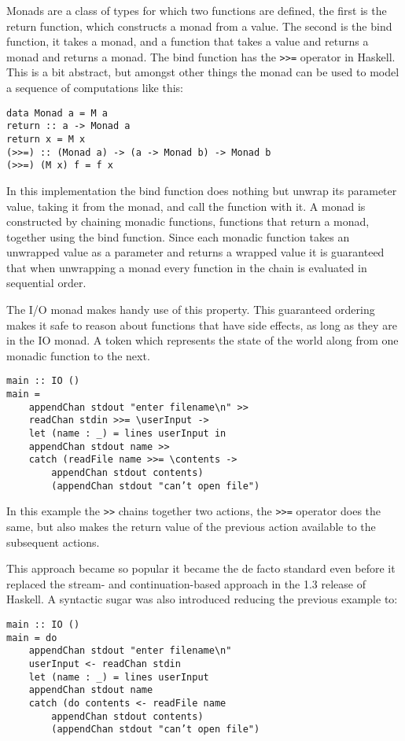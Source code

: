 Monads are a class of types for which two functions are defined, the first is the return function, which constructs a monad from a value.
 The second is the bind function, it takes a monad, and a function that takes a value and returns a monad and returns a monad.
The bind function has the \lstinline{>>=} operator in Haskell.
 This is a bit abstract, but amongst other things the monad can be used to model a sequence of computations like this:

\begin{lstlisting}[caption={Sequence of computations monad}]
data Monad a = M a
return :: a -> Monad a
return x = M x
(>>=) :: (Monad a) -> (a -> Monad b) -> Monad b
(>>=) (M x) f = f x
\end{lstlisting}

In this implementation the bind function does nothing but unwrap its parameter value, taking it from the monad, and call the function with it.
A monad is constructed by chaining monadic functions, functions that return a monad, together using the bind function. Since each monadic function takes an unwrapped value as a parameter and returns a wrapped value it is guaranteed that when unwrapping a monad every function in the chain is evaluated in sequential order.

The I/O monad makes handy use of this property. This guaranteed ordering makes it safe to reason about functions that have side effects, as long as they are in the IO monad. 
A token which represents the state of the world along from one monadic function to the next.

\begin{lstlisting}[caption={Example of monadic I/O in Haskell}]
main :: IO ()
main =
	appendChan stdout "enter filename\n" >>
	readChan stdin >>= \userInput ->
	let (name : _) = lines userInput in
	appendChan stdout name >>
	catch (readFile name >>= \contents ->
		appendChan stdout contents)
		(appendChan stdout "can’t open file")
\end{lstlisting}

In this example the \lstinline!>>! chains together two actions, the \lstinline!>>=! operator does the same, but also makes the return value of the previous action available to the subsequent actions.

This approach became so popular it became the de facto standard even before it replaced the stream- and continuation-based approach in the 1.3 release of Haskell\cite{haskell12to13}. A syntactic sugar was also introduced reducing the previous example to:

\begin{lstlisting}[caption={Example of monadic I/O in Haskell}]
main :: IO ()
main = do
	appendChan stdout "enter filename\n"
	userInput <- readChan stdin
	let (name : _) = lines userInput
	appendChan stdout name
	catch (do contents <- readFile name
		appendChan stdout contents)
		(appendChan stdout "can’t open file")
\end{lstlisting}
